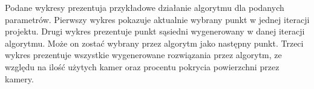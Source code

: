 \documentclass[12pt,a4paper]{article}
\begin{document}
\begin{landscape}
\pagestyle{empty}
\begin{figure}
\begin{floatrow}
       }
       \ffigbox[\FBwidth]{\caption{MediumMap, $d_p=1$, $d_k=0.1$, $skala=5$}\label{fig-4}}{%
         \texttt{[image: \{mediumMap\_1\_0.1\_5]}.png}
       }
       \end{floatrow}
\end{figure}
\end{landscape}

Podane wykresy prezentuja przykładowe działanie algorytmu dla podanych parametrów.
Pierwszy wykres pokazuje aktualnie wybrany punkt w jednej iteracji projektu.
Drugi wykres prezentuje punkt sąsiedni wygenerowany w danej iteracji algorytmu.
Może on zostać wybrany przez algorytm jako następny punkt.
Trzeci wykres prezentuje wszystkie wygenerowane rozwiązania przez algorytm, ze względu
na ilość użytych kamer oraz procentu pokrycia powierzchni przez kamery.
\end{document}

